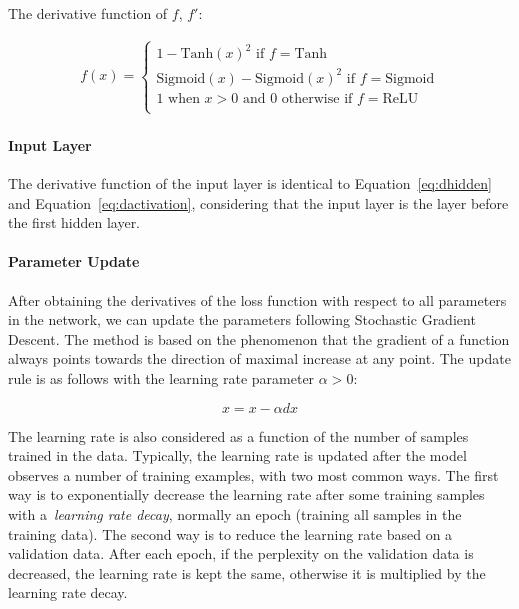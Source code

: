 The derivative function of $f$, $f'$:

\begin{equation}
\begin{aligned}
f(x) = 
\begin{cases}
1 - \text{Tanh}(x)^2   \text{    if } f = \text{Tanh} \\
\text{Sigmoid}(x) - \text{Sigmoid}(x)^2                \text{     if } f = \text{Sigmoid} \\
1 \text{ when } x > 0 \text{ and 0 otherwise}  \text{     if } f = \text{ReLU} \\
\end{cases}
\label{eq:dactivation}
\end{aligned}
\end{equation}


\paragraph{Input Layer}

The derivative function of the input layer is identical to Equation~\ref{eq:dhidden} and Equation~\ref{eq:dactivation}, considering that the input layer is the layer before the first hidden layer. 

\paragraph{Parameter Update}

After obtaining the derivatives of the loss function with respect to all parameters in the network, we can update the parameters following Stochastic Gradient Descent. The method is based on the phenomenon that the gradient of a function always points towards the direction of maximal increase at any point. The update rule is as follows with the learning rate parameter $\alpha > 0$:

\begin{equation}
x = x - \alpha dx
\label{eq:sgd}
\end{equation}

The learning rate is also considered as a function of the number of samples trained in the data. Typically, the learning rate is updated after the model observes a number of training examples, with two most common ways. The first way is to exponentially decrease the learning rate after some training samples with a~\textit{learning rate decay}, normally an epoch (training all samples in the training data). The second way is to reduce the learning rate based on a validation data. After each epoch, if the perplexity on the validation data is decreased, the learning rate is kept the same, otherwise it is multiplied by the learning rate decay.



